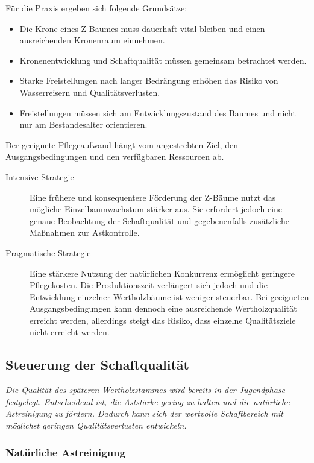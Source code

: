 \documentclass[twocolumn, bibliography=totoc, abstract=true]{scrartcl}
\begin{document}
Für die Praxis ergeben sich folgende Grundsätze:

\begin{itemize}
\item Die Krone eines Z-Baumes muss dauerhaft vital bleiben und einen ausreichenden Kronenraum einnehmen.
\item Kronenentwicklung und Schaftqualität müssen gemeinsam betrachtet werden.
\item Starke Freistellungen nach langer Bedrängung erhöhen das Risiko von Wasserreisern und Qualitätsverlusten.
\item Freistellungen müssen sich am Entwicklungszustand des Baumes und nicht nur am Bestandesalter orientieren.
\end{itemize}

Der geeignete Pflegeaufwand hängt vom angestrebten Ziel, den Ausgangsbedingungen und den verfügbaren Ressourcen ab.

\begin{description}
\item[Intensive Strategie] Eine frühere und konsequentere Förderung der Z-Bäume nutzt das mögliche Einzelbaumwachstum stärker aus. Sie erfordert jedoch eine genaue Beobachtung der Schaftqualität und gegebenenfalls zusätzliche Maßnahmen zur Astkontrolle.
\item[Pragmatische Strategie] Eine stärkere Nutzung der natürlichen Konkurrenz ermöglicht geringere Pflegekosten. Die Produktionszeit verlängert sich jedoch und die Entwicklung einzelner Wertholzbäume ist weniger steuerbar. Bei geeigneten Ausgangsbedingungen kann dennoch eine ausreichende Wertholzqualität erreicht werden, allerdings steigt das Risiko, dass einzelne Qualitätsziele nicht erreicht werden.
\end{description}

\subsection{Steuerung der Schaftqualität}

\emph{Die Qualität des späteren Wertholzstammes wird bereits in der Jugendphase festgelegt. Entscheidend ist, die Aststärke gering zu halten und die natürliche Astreinigung zu fördern. Dadurch kann sich der wertvolle Schaftbereich mit möglichst geringen Qualitätsverlusten entwickeln.}

\subsubsection{Natürliche Astreinigung}
\end{document}
